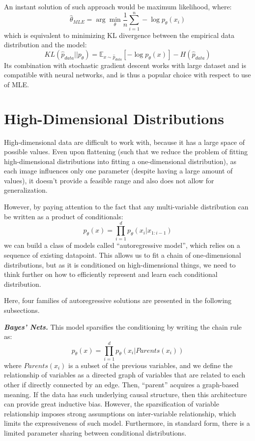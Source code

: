An instant solution of such approach would be maximum likelihood, where:
\[
    \hat{\theta}_{MLE} = \arg \min_\theta \frac{1}{n} \sum_{i=1}^n -\log p_\theta (x_i)
\]
which is equivalent to minimizing KL divergence between the empirical data distribution and the model:
\[
    KL(\hat{p}_{data} || p_\theta) = \mathbb{E}_{x \sim \hat{p}_{data}} \left[-\log p_\theta (x)\right] - H(\hat{p}_{data})
\]
Its combination with stochastic gradient descent works with large dataset and is compatible with neural networks, and is thus a popular choice with respect to use of MLE.

\section{High-Dimensional Distributions}
High-dimensional data are difficult to work with, because it has a large space of possible values.
Even upon flattening (such that we reduce the problem of fitting high-dimensional distributions into fitting a one-dimensional distribution), as each image influences only one parameter (despite having a large amount of values), it doesn't provide a feasible range and also does not allow for generalization.

However, by paying attention to the fact that any multi-variable distribution can be written as a product of conditionals:
\[
    p_\theta (x) = \prod_{i=1}^d p_\theta (x_i | x_{1:i-1})
\]
we can build a class of models called ``autoregressive model'', which relies on a sequence of existing datapoint.
This allows us to fit a chain of one-dimensional distributions, but as it is conditioned on high-dimensional things, we need to think further on how to efficiently represent and learn each conditional distribution.

Here, four families of autoregressive solutions are presented in the following subsections.

\textbf{\textit{Bayes' Nets.}}
This model sparsifies the conditioning by writing the chain rule as:
\[
    p_\theta (x) = \prod_{i=1}^d p_\theta (x_i | Parents(x_i))
\]
where $Parents(x_i)$ is a subset of the previous variables, and we define the relationship of variables as a directed graph of variables that are related to each other if directly connected by an edge.
Then, ``parent'' acquires a graph-based meaning.
If the data has such underlying causal structure, then this architecture can provide great inductive bias.
However, the sparsification of variable relationship imposes strong assumptions on inter-variable relationship, which limits the expressiveness of such model.
Furthermore, in standard form, there is a limited parameter sharing between conditional distributions.

